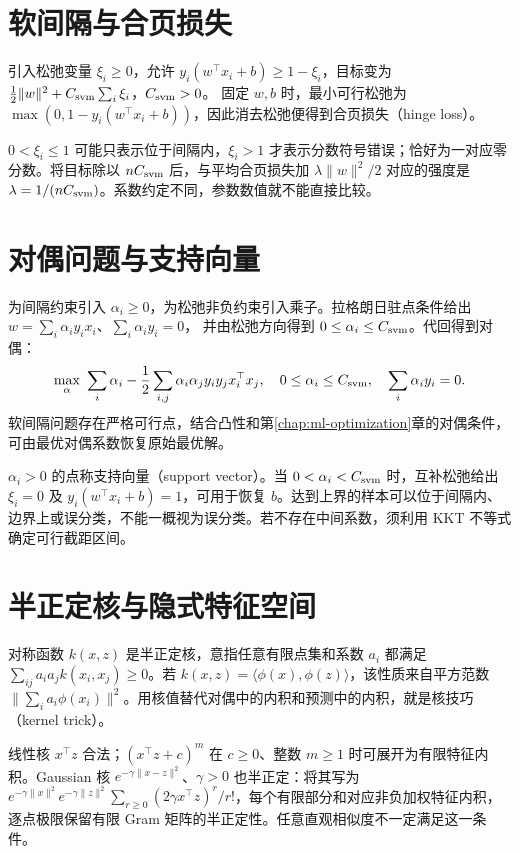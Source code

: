 \documentclass[UTF8,12pt,a4paper,fontset=fandol]{ctexbook}
\begin{document}
\section{软间隔与合页损失}

引入松弛变量 $\xi_i\geq0$，允许 $y_i(w^\top x_i+b)\geq1-\xi_i$，目标变为
$\frac12\|w\|^2+C_{\rm svm}\sum_i\xi_i$，$C_{\rm svm}>0$。
固定 $w,b$ 时，最小可行松弛为 $\max(0,1-y_i(w^\top x_i+b))$，因此消去松弛便得到合页损失（hinge loss）。

$0<\xi_i\leq1$ 可能只表示位于间隔内，$\xi_i>1$ 才表示分数符号错误；恰好为一对应零分数。将目标除以 $nC_{\rm svm}$ 后，与平均合页损失加 $\lambda\|w\|^2/2$ 对应的强度是 $\lambda=1/(nC_{\rm svm})$。系数约定不同，参数数值就不能直接比较。

\section{对偶问题与支持向量}

为间隔约束引入 $\alpha_i\geq0$，为松弛非负约束引入乘子。拉格朗日驻点条件给出
$w=\sum_i\alpha_iy_ix_i$、$\sum_i\alpha_iy_i=0$，
并由松弛方向得到 $0\leq\alpha_i\leq C_{\rm svm}$。代回得到对偶：
\begin{equation}
 \max_\alpha\ \sum_i\alpha_i-\frac12\sum_{i,j}\alpha_i\alpha_jy_iy_jx_i^\top x_j,
 \quad 0\leq\alpha_i\leq C_{\rm svm},\quad \sum_i\alpha_iy_i=0.
 \label{eq:ml-svm-dual}
\end{equation}
软间隔问题存在严格可行点，结合凸性和第\ref{chap:ml-optimization}章的对偶条件，可由最优对偶系数恢复原始最优解。

$\alpha_i>0$ 的点称支持向量（support vector）。当 $0<\alpha_i<C_{\rm svm}$ 时，互补松弛给出 $\xi_i=0$ 及 $y_i(w^\top x_i+b)=1$，可用于恢复 $b$。达到上界的样本可以位于间隔内、边界上或误分类，不能一概视为误分类。若不存在中间系数，须利用 KKT 不等式确定可行截距区间。

\section{半正定核与隐式特征空间}

对称函数 $k(x,z)$ 是半正定核，意指任意有限点集和系数 $a_i$ 都满足 $\sum_{ij}a_ia_jk(x_i,x_j)\geq0$。若 $k(x,z)=\langle\phi(x),\phi(z)\rangle$，该性质来自平方范数 $\|\sum_i a_i\phi(x_i)\|^2$。用核值替代对偶中的内积和预测中的内积，就是核技巧（kernel trick）。

线性核 $x^\top z$ 合法；$(x^\top z+c)^m$ 在 $c\geq0$、整数 $m\geq1$ 时可展开为有限特征内积。Gaussian 核 $e^{-\gamma\|x-z\|^2}$、$\gamma>0$ 也半正定：将其写为 $e^{-\gamma\|x\|^2}e^{-\gamma\|z\|^2}\sum_{r\geq0}(2\gamma x^\top z)^r/r!$，每个有限部分和对应非负加权特征内积，逐点极限保留有限 Gram 矩阵的半正定性。任意直观相似度不一定满足这一条件。
\end{document}
